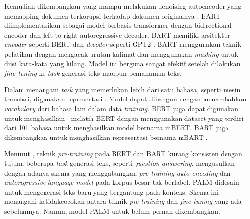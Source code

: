 Kemudian dikembangkan  yang mampu melakukan denoising autoencoder yang memapping dokumen terkorupsi terhadap dokumen originalnya .
\gls{BART} diimplementasikan sebagai model berbasis transformer dengan bidirectional encoder dan left-to-right autoregressive decoder.
\gls{BART} memiliki arsitektur \textit{encoder} seperti \gls{BERT}  dan \textit{decoder} seperti \gls{GPT2} .
\gls{BART} menggunakan teknik pelatihan dengan mengacak urutan kalimat dan menggunakan \textit{masking} untuk diisi kata-kata yang hilang.
Model ini berguna sangat efektif setelah dilakukan \textit{fine-tuning} ke \textit{task} generasi teks maupun pemahaman teks.


Dalam menangani \textit{task} yang memerlukan lebih dari satu bahasa, seperti mesin translasi, digunakan representasi \mwordem{}.
Model \multil{} dapat dibangun dengan menambahkan \textit{vocabulary} dari bahasa lain dalam data \textit{training}.
\gls{BERT} juga dapat digunakan untuk menghasilkan \mwordem{}.
\textcite{devlin2019} melatih \gls{BERT} dengan menggunakan dataset yang terdiri dari 101 bahasa untuk menghasilkan \multil{} model bernama mBERT.
\gls{BART} juga dikembangkan untuk menghasilkan representasi \mwordem{} bernama mBART .

Menurut \textcite{bi2020}, teknik \textit{pre-training} pada \gls{BERT} dan \gls{BART} kurang konsisten dengan tujuan beberapa \textit{task} generasi teks, seperti \textit{question answering}.
\textcite{bi2020} mengusulkan  dengan adanya skema yang menggabungkan \textit{pre-training} \textit{auto-encoding} dan \textit{autoregressive} \textit{language model} pada korpus besar tak berlabel.
\gls{PALM} didesain untuk mengenerasi teks baru yang bergantung pada konteks.
Skema ini menangani ketidakcocokan antara teknik \textit{pre-training} dan \textit{fine-tuning} yang ada sebelumnya.
Namun, model \gls{PALM} untuk \mwordem{} belum pernah dikembangkan.
